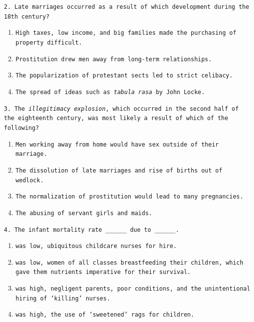 \documentclass[11pt]{scrartcl} %
\begin{document}

\texttt{2. Late marriages occurred as a result of which development during the 18th century?}

\begin{enumerate}[label=\texttt{\textbf{\alph*)}}]
\item \texttt{High taxes, low income, and big families made the purchasing of property difficult.}
\item \texttt{Prostitution drew men away from long-term relationships.}
\item \texttt{The popularization of protestant sects led to strict celibacy.}
\item \texttt{The spread of ideas such as \textit{tabula rasa} by John Locke.}
\end{enumerate}


\texttt{3. The \textit{illegitimacy explosion}, which occurred in the second half of the eighteenth century, was most likely a result of which of the following?}

\begin{enumerate}[label=\texttt{\textbf{\alph*)}}]
\item \texttt{Men working away from home would have sex outside of their marriage.}
\item \texttt{The dissolution of late marriages and rise of births out of wedlock.}
\item \texttt{The normalization of prostitution would lead to many pregnancies.}
\item \texttt{The abusing of servant girls and maids.}
\end{enumerate}



\texttt{4. The infant mortality rate \_\_\_\_\_\_ due to \_\_\_\_\_\_.}

\begin{enumerate}[label=\texttt{\textbf{\alph*)}}]
\item \texttt{was low, ubiquitous childcare nurses for hire.}
\item \texttt{was low, women of all classes breastfeeding their children, which gave them nutrients imperative for their survival.}
\item \texttt{was high, negligent parents, poor conditions, and the unintentional hiring of `killing' nurses.}
\item \texttt{was high, the use of `sweetened' rags for children.}
\end{enumerate}
\end{document}
